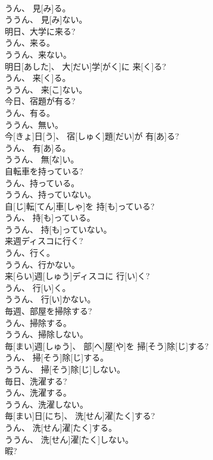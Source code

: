 \documentclass[8pt]{extreport}
\begin{document}
\begin{CJK}{UTF8}{min}
\\	うん、 見[み]る。 
\\	ううん、 見[み]ない。
\\	明日、大学に来る? 
\\	うん、来る。 
\\	ううん、来ない。	
\\	明日[あした]、 大[だい]学[がく]に 来[く]る? 
\\	うん、 来[く]る。 
\\	ううん、 来[こ]ない。
\\	今日、宿題が有る? 
\\	うん、有る。 
\\	ううん、無い。	
\\	今[きょ]日[う]、 宿[しゅく]題[だい]が 有[あ]る? 
\\	うん、 有[あ]る。 
\\	ううん、 無[な]い。
\\	自転車を持っている? 
\\	うん、持っている。 
\\	ううん、持っていない。	
\\	自[じ]転[てん]車[しゃ]を 持[も]っている? 
\\	うん、 持[も]っている。 
\\	ううん、 持[も]っていない。
\\	来週ディスコに行く? 
\\	うん、行く。 
\\	ううん、行かない。	
\\	来[らい]週[しゅう]ディスコに 行[い]く? 
\\	うん、 行[い]く。 
\\	ううん、 行[い]かない。
\\	毎週、部屋を掃除する? 
\\	うん、掃除する。 
\\	ううん、掃除しない。	
\\	毎[まい]週[しゅう]、 部[へ]屋[や]を 掃[そう]除[じ]する? 
\\	うん、 掃[そう]除[じ]する。 
\\	ううん、 掃[そう]除[じ]しない。
\\	毎日、洗濯する? 
\\	うん、洗濯する。 
\\	ううん、洗濯しない。	
\\	毎[まい]日[にち]、 洗[せん]濯[たく]する? 
\\	うん、 洗[せん]濯[たく]する。 
\\	ううん、 洗[せん]濯[たく]しない。
\\	暇? 

\end{CJK}
\end{document}

